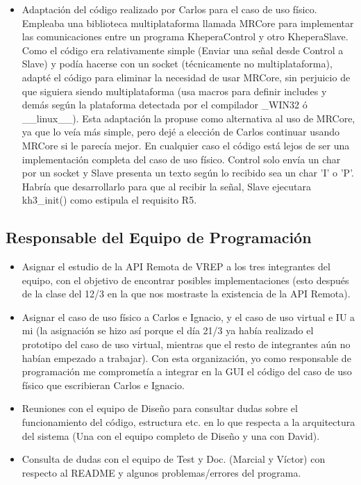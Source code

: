 \documentclass{article}
\begin{document}
\begin{itemize}
	\item Adaptación del código realizado por Carlos para el caso de uso físico.
	\subitem Empleaba una biblioteca multiplataforma llamada MRCore para implementar las
	comunicaciones entre un programa KheperaControl y otro KheperaSlave. Como el código era
	relativamente simple (Enviar una señal desde Control a Slave) y podía hacerse
	con un socket (técnicamente no multiplataforma), adapté el código para eliminar
	la necesidad de usar MRCore, sin perjuicio de que siguiera siendo
	multiplataforma (usa macros para definir includes y demás según la plataforma
	detectada por el compilador \_WIN32 ó \_\_linux\_\_). Esta adaptación la
	propuse como alternativa al uso de MRCore, ya que lo veía más simple, pero dejé
	a elección de Carlos continuar usando MRCore si le parecía mejor. En cualquier
	caso el código está lejos de ser una implementación completa del caso de uso
	físico. Control solo envía un char por un socket y Slave presenta un texto
	según lo recibido sea un char 'I' o 'P'. Habría que desarrollarlo para que al
	recibir la señal, Slave ejecutara kh3\_init() como	estipula el requisito R5.
\end{itemize}

\subsection{Responsable del Equipo de Programación}

\begin{itemize}
  \item Asignar el estudio de la API Remota de VREP a los tres integrantes del
  equipo, con el objetivo de encontrar posibles implementaciones (esto después
  de la clase del 12/3 en la que nos mostraste la existencia de la API Remota).
  \item Asignar el caso de uso físico a Carlos e Ignacio, y el caso de uso
  virtual e IU a mi (la asignación se hizo así porque el día 21/3 ya había
  realizado el prototipo del caso de uso virtual, mientras que el resto de
  integrantes aún no habían empezado a trabajar). Con esta
  organización, yo como responsable de programación me comprometía a integrar en
  la GUI el código del caso de uso físico que escribieran Carlos e Ignacio.
  \item Reuniones con el equipo de Diseño para consultar dudas sobre el
  funcionamiento del código, estructura etc. en lo que respecta a la
  arquitectura del sistema (Una con el equipo completo de Diseño y una con
  David).
  \item Consulta de dudas con el equipo de Test y Doc. (Marcial y Víctor) con
  respecto al README y algunos problemas/errores del programa.
\end{itemize}
\end{document}
